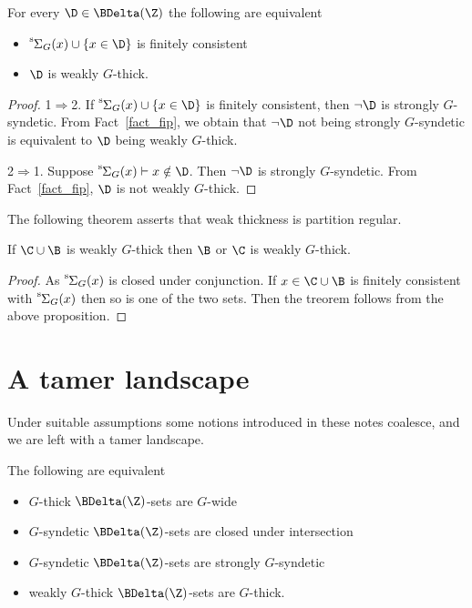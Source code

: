 \begin{proposition}\label{prop_q_w_pers}
  For every $\D\in\BDelta(\Z)$ the following are equivalent
  \begin{itemize}
    \item [1.] ${\mathstrut}^{\rm s}\kern-.1ex\Sigma_G(x)\cup\{x\in\D\}$ is finitely consistent
    \item [2.] $\D$ is weakly $G$-thick.
  \end{itemize}
\end{proposition}

\begin{proof}
  1$\Rightarrow$2. 
  If ${\mathstrut}^{\rm s}\kern-.1ex\Sigma_G(x)\cup\{x\in\D\}$ is finitely consistent, then $\neg\D$ is strongly $G$-syndetic.
  From Fact~\ref{fact_fip}, we obtain that $\neg\D$ not being strongly $G$-syndetic is equivalent to $\D$ being weakly $G$-thick.

  2$\Rightarrow$1.
  Suppose ${\mathstrut}^{\rm s}\kern-.1ex\Sigma_G(x)\vdash x\notin\D$.
  Then $\neg\D$ is strongly $G$-syndetic.
  From Fact~\ref{fact_fip}, $\D$ is not weakly $G$-thick.
\end{proof}

The following theorem asserts that weak thickness is partition regular.

\begin{theorem}\label{thm_wt_partreg}
  If $\C\cup\B$ is weakly $G$-thick then $\B$ or $\C$ is weakly $G$-thick.
\end{theorem}

\begin{proof}
  As ${\mathstrut}^{\rm s}\kern-.1ex\Sigma_G(x)$ is closed under conjunction.
  If $x\in \C\cup\B$ is finitely consistent with ${\mathstrut}^{\rm s}\kern-.1ex\Sigma_G(x)$ then so is one of the two sets.
  Then the treorem follows from the above proposition.
\end{proof}

\section{A tamer landscape}\label{tame_landscape}

Under suitable assumptions some notions introduced in these notes coalesce, and we are left with a tamer landscape.

\begin{theorem}\label{thm_coalesce}
  The following are equivalent
  \begin{itemize}
    \item[1.] $G$-thick $\BDelta({\Z})$-sets are $G$-wide
    \item[2.] $G$-syndetic $\BDelta({\Z})$-sets are closed under intersection 
    \item[3.] $G$-syndetic $\BDelta({\Z})$-sets are strongly $G$-syndetic
    \item[4.] weakly $G$-thick $\BDelta({\Z})$-sets are $G$-thick.
  \end{itemize}
\end{theorem}

